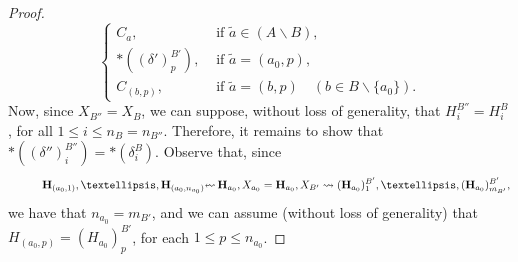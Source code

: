 \documentclass[11pt]{article}
\theoremstyle{definition}
\numberwithin{equation}{section}
\numberwithin{equation}{section}
\newcommand{\set}[1]{\{#1\}}
\newcommand{\hyper}[1]{{\bf #1}}
\newcommand{\plunderline}[1]{#1}
\begin{document}
\begin{proof}
$$\begin{cases}
C_a, & \mbox{ if } \tilde{a}\in (A\backslash {B}),\\
\ast((\delta')^{{B'}}_{p}), & \mbox{ if } \tilde{a}=(a_0,p),\\
C_{(b,p)}, & \mbox{ if } \tilde{a}=(b,p) \quad(b\in {B}\backslash\set{a_0}).
\end{cases}$$
 Now, since $X_{B''}=X_{\plunderline{B}}$, 
we can suppose, without loss of generality, that $H_{i}^{B''}=H^{\plunderline{B}}_{i}$, for all $1\leq i\leq n_{\plunderline{B}}=n_{B''}$. Therefore, it remains to show that $\ast((\delta'')^{B''}_{i})=\ast(\delta_i^{\plunderline{B}})$. Observe that, since $$\quad\quad\quad \hyper{H}_{(a_0,1)},\dots,\hyper{H}_{(a_0,n_{a_0})}\reflectbox{$\leadsto$}\,{\bf H}_{a_0}, X_{a_0}={\bf H}_{a_0}, X_{\plunderline{B'}}\leadsto (\hyper{H}_{a_0})_1^{\plunderline{B'}},\dots,(\hyper{H}_{a_0})^{\plunderline{B'}}_{m_{\plunderline{B'}}},$$
we have that $n_{a_0}=m_{\plunderline{B'}}$, and  we can assume (without loss of generality) that $H_{(a_0,p)}=(H_{a_0})^{\plunderline{B'}}_p$, for each $1\leq p\leq n_{a_0}$.   


\end{proof}
\end{document}

